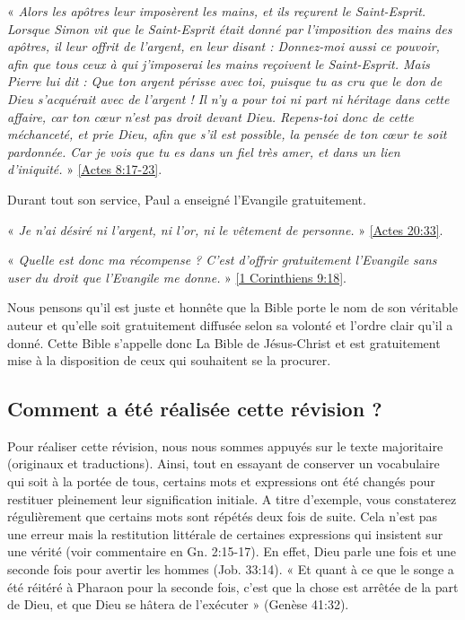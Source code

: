 \begin{small}
« \emph{Alors les apôtres leur imposèrent les mains, et ils reçurent le Saint-Esprit. Lorsque Simon vit que le Saint-Esprit était donné par l'imposition des mains des apôtres, il leur offrit de l'argent, en leur disant : Donnez-moi aussi ce pouvoir, afin que tous ceux à qui j'imposerai les mains reçoivent le Saint-Esprit. Mais Pierre lui dit : Que ton argent périsse avec toi, puisque tu as cru que le don de Dieu s'acquérait avec de l'argent ! Il n'y a pour toi ni part ni héritage dans cette affaire, car ton cœur n'est pas droit devant Dieu. Repens-toi donc de cette méchanceté, et prie Dieu, afin que s'il est possible, la pensée de ton cœur te soit pardonnée. Car je vois que tu es dans un fiel très amer, et dans un lien d'iniquité.} » \vref{Actes 8:17-23}.

Durant tout son service, Paul a enseigné l'Evangile gratuitement.

« \emph{Je n'ai désiré ni l'argent, ni l'or, ni le vêtement de personne.} » \vref{Actes 20:33}.

« \emph{Quelle est donc ma récompense ? C'est d'offrir gratuitement l'Evangile sans user du droit que l'Evangile me donne.} » \vref{1 Corinthiens 9:18}.

Nous pensons qu'il est juste et honnête que la Bible porte le nom de son véritable auteur et qu'elle soit gratuitement diffusée selon sa volonté et l'ordre clair qu'il a donné. Cette Bible s'appelle donc La Bible de Jésus-Christ et est gratuitement mise à la disposition de ceux qui souhaitent se la procurer. 

\subsection*{Comment a été réalisée cette révision ?}

Pour réaliser cette révision, nous nous sommes appuyés sur le texte majoritaire (originaux et traductions). Ainsi, tout en essayant de conserver un vocabulaire qui soit à la portée de tous, certains mots et expressions ont été changés pour restituer pleinement leur signification initiale. A titre d'exemple, vous constaterez régulièrement que certains mots sont répétés deux fois de suite. Cela n'est pas une erreur mais la restitution littérale de certaines expressions qui insistent sur une vérité (voir commentaire en Gn. 2:15-17). En effet, Dieu parle une fois et une seconde fois pour avertir les hommes (Job. 33:14). « Et quant à ce que le songe a été réitéré à Pharaon pour la seconde fois, c'est que la chose est arrêtée de la part de Dieu, et que Dieu se hâtera de l'exécuter » (Genèse 41:32).


\end{small}
